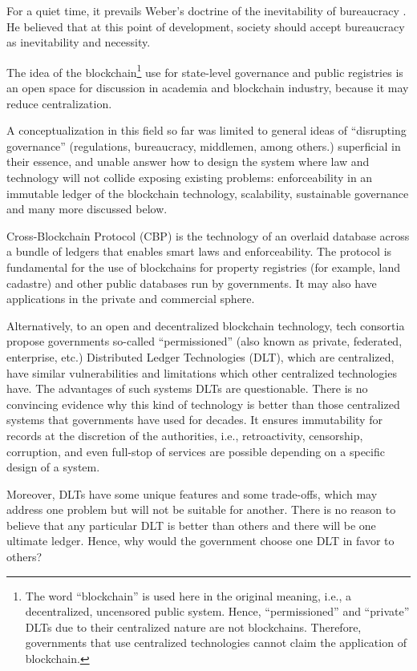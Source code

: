 \begin{multicols}{2}
For a quiet time, it prevails Weber’s doctrine of the inevitability of bureaucracy \cite{art1-key01}. He believed that at this point of development, society should accept bureaucracy as inevitability and necessity.

The idea of the blockchain\footnote{The word “blockchain” is used here in the original meaning, i.e., a decentralized, uncensored public system. Hence, “permissioned” and “private” DLTs due to their centralized nature are not blockchains. Therefore, governments that use centralized technologies cannot claim the application of blockchain.} use for state-level governance and public registries is an open space for discussion in academia and blockchain industry, because it may reduce centralization.

A conceptualization in this field so far was limited to general ideas of “disrupting governance” (regulations, bureaucracy, middlemen, among others.) superficial in their essence, and unable answer how to design the system where law and technology will not collide exposing existing problems: enforceability in an immutable ledger of the blockchain technology, scalability, sustainable governance and many more discussed below.

Cross-Blockchain Protocol (CBP) is the technology of an overlaid database across a bundle of ledgers that enables smart laws and enforceability. The protocol is fundamental for the use of blockchains for property registries (for example, land cadastre) and other public databases run by governments. It may also have applications in the private and commercial sphere.

Alternatively, to an open and decentralized blockchain technology, tech consortia propose governments so-called “permissioned” (also known as private, federated, enterprise, etc.) Distributed Ledger Technologies (DLT), which are centralized, have similar vulnerabilities and limitations which other centralized technologies have. The advantages of such systems DLTs are questionable. There is no convincing evidence why this kind of technology is better than those centralized systems that governments have used for decades. It ensures immutability for records at the discretion of the authorities, i.e., retroactivity, censorship, corruption, and even full-stop of services are possible depending on a specific design of a system.

Moreover, DLTs have some unique features and some trade-offs, which may address one problem but will not be suitable for another. There is no reason to believe that any particular DLT is better than others and there will be one ultimate ledger. Hence, why would the government choose one DLT in favor to others?


\end{multicols}
